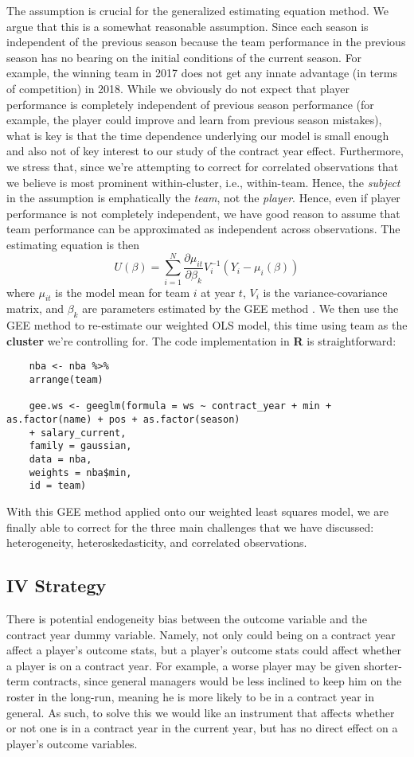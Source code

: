 \documentclass[12pt]{article}
\begin{document}
	The assumption is crucial for the generalized estimating equation method. We argue that this is a somewhat reasonable assumption. Since each season is independent of the previous season because the team performance in the previous season has no bearing on the initial conditions of the current season. For example, the winning team in 2017 does not get any innate advantage (in terms of competition) in 2018. While we obviously do not expect that player performance is completely independent of previous season performance (for example, the player could improve and learn from previous season mistakes), what is key is that the time dependence underlying our model is small enough and also not of key interest to our study of the contract year effect. Furthermore, we stress that, since we're attempting to correct for correlated observations that we believe is most prominent within-cluster, i.e., within-team. Hence, the \emph{subject} in the assumption is emphatically the \emph{team}, not the \emph{player}. Hence, even if player performance is not completely independent, we have good reason to assume that team performance can be approximated as independent across observations. The estimating equation is then \[
	U\left(\beta\right) = \sum_{i=1}^N \frac{\partial \mu_{it}}{\partial \beta_k} V_i^{-1} \left(Y_i - \mu_i\left(\beta\right)\right)
	\] where $\mu_{it}$ is the model mean for team $i$ at year $t$, $V_i$ is the variance-covariance matrix, and $\beta_k$ are parameters estimated by the GEE method \citep{diggle_analysis_2002}. We then use the GEE method to re-estimate our weighted OLS model, this time using team as the \textbf{cluster} we're controlling for. The code implementation in \textbf{R} is straightforward:
	
	\begin{lstlisting}
	nba <- nba %>%
	arrange(team)
	
	gee.ws <- geeglm(formula = ws ~ contract_year + min + as.factor(name) + pos + as.factor(season) 
	+ salary_current,
	family = gaussian,
	data = nba,
	weights = nba$min,
	id = team)
	\end{lstlisting}
	
	With this GEE method applied onto our weighted least squares model, we are finally able to correct for the three main challenges that we have discussed: heterogeneity, heteroskedasticity, and correlated observations.
	
	\subsection{IV Strategy}
	There is potential endogeneity bias between the outcome variable and the contract year dummy variable. Namely, not only could being on a contract year affect a player’s outcome stats, but a player’s outcome stats could affect whether a player is on a contract year. For example, a worse player may be given shorter-term contracts, since general managers would be less inclined to keep him on the roster in the long-run, meaning he is more likely to be in a contract year in general. As such, to solve this we would like an instrument that affects whether or not one is in a contract year in the current year, but has no direct effect on a player’s outcome variables.
	
\end{document}
